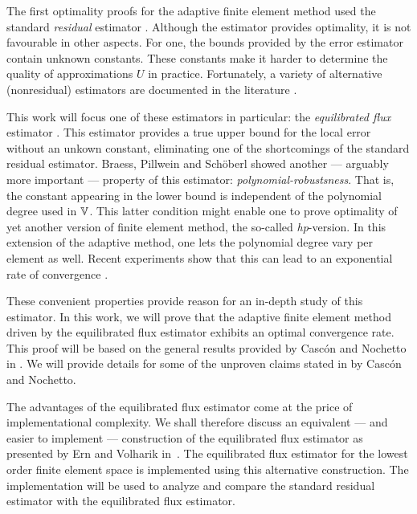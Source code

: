 \documentclass[thesis.tex]{subfiles}
\begin{document}
The first optimality proofs for the adaptive finite element method used the standard \emph{residual} estimator \cite{binev, stevenson2007optimality,cascon2008}. Although
the estimator provides optimality, it is not favourable in other aspects. For one, the bounds provided
by the error estimator contain unknown constants. These constants make it harder to determine the quality of 
approximations $U$ in practice.  Fortunately, a variety of alternative (nonresidual) estimators are documented in the literature
\cite{verfurth2013posteriori}.

This work will focus one of these estimators in particular:
the \emph{equilibrated flux} estimator \cite{braessequil, braessequilrobust, ernequil}. This estimator provides a true upper bound
for the local error without an unkown constant, eliminating one of the shortcomings of the standard residual estimator. 
Braess, Pillwein and Sch\"oberl \cite{braessequilrobust} showed another --- arguably more important --- property of this estimator: \emph{polynomial-robustsness}. That is,
the constant appearing in the lower bound is independent of the polynomial degree used in $\mathbb{V}$.
This latter condition might enable one to prove optimality of yet another version of finite element method, the so-called
\emph{hp}-version. In this extension of the adaptive method, one lets the polynomial degree vary per element as well.
Recent experiments show that this can lead to an exponential rate of convergence \cite{dolejvsi2015hp}.

These convenient properties provide reason for an in-depth study of this estimator.
In this work, we will prove that the adaptive finite element method driven by the equilibrated flux estimator 
exhibits an optimal convergence rate. This proof will be based on the general results provided by Casc\'on and Nochetto 
in \cite{cascon2012}. We will provide details for some of the unproven claims stated in \cite{cascon2012}
by Casc\'on and Nochetto.

The advantages of the equilibrated flux estimator come at the price of implementational
complexity. We shall therefore discuss an equivalent --- and easier to implement --- construction of the equilibrated flux estimator
as presented by Ern and Volharik in~\cite{ernequil}. The equilibrated flux estimator
for the lowest order finite element space is implemented using this alternative construction. The implementation
will be used to analyze and compare the standard residual estimator with the equilibrated flux estimator.
\end{document}
